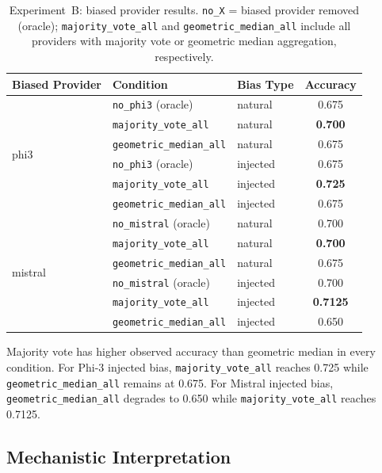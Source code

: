 \documentclass[11pt]{article}
\begin{document}
\begin{table}[h]
\centering
\caption{Experiment~B: biased provider results. \texttt{no\_X} = biased provider
  removed (oracle); \texttt{majority\_vote\_all} and \texttt{geometric\_median\_all}
  include all providers with majority vote or geometric median aggregation,
  respectively.}
\label{tab:exp-b}
\small
\begin{tabular}{lllc}
\toprule
\textbf{Biased Provider} & \textbf{Condition} & \textbf{Bias Type} & \textbf{Accuracy} \\
\midrule
\multirow{6}{*}{phi3}
  & \texttt{no\_phi3} (oracle)       & natural  & 0.675 \\
  & \texttt{majority\_vote\_all}     & natural  & \textbf{0.700} \\
  & \texttt{geometric\_median\_all}  & natural  & 0.675 \\
  & \texttt{no\_phi3} (oracle)       & injected & 0.675 \\
  & \texttt{majority\_vote\_all}     & injected & \textbf{0.725} \\
  & \texttt{geometric\_median\_all}  & injected & 0.675 \\
\midrule
\multirow{6}{*}{mistral}
  & \texttt{no\_mistral} (oracle)    & natural  & 0.700 \\
  & \texttt{majority\_vote\_all}     & natural  & \textbf{0.700} \\
  & \texttt{geometric\_median\_all}  & natural  & 0.675 \\
  & \texttt{no\_mistral} (oracle)    & injected & 0.700 \\
  & \texttt{majority\_vote\_all}     & injected & \textbf{0.7125} \\
  & \texttt{geometric\_median\_all}  & injected & 0.650 \\
\bottomrule
\end{tabular}
\end{table}

Majority vote has higher observed accuracy than geometric median in every
condition. For Phi-3 injected bias, \texttt{majority\_vote\_all} reaches 0.725
while \texttt{geometric\_median\_all} remains at 0.675. For Mistral injected
bias, \texttt{geometric\_median\_all} degrades to 0.650 while
\texttt{majority\_vote\_all} reaches 0.7125.

\subsection{Mechanistic Interpretation}
\label{sec:multi-interp}
\end{document}
